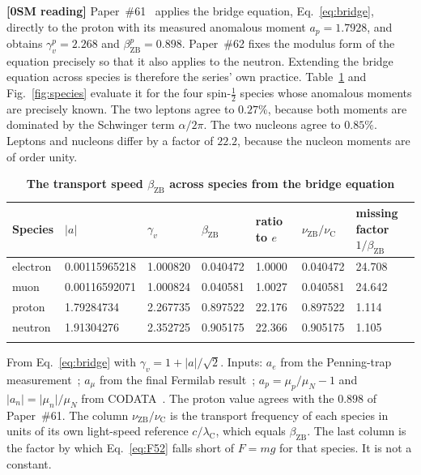\documentclass[%
 reprint, amsmath,amssymb, aps, prb, ]{revtex4-2}
\numberwithin{equation}{section}
\newcommand{\betaZB}{\beta_{\text{ZB}}}
\newcommand{\lambdaC}{\lambda_{\text{C}}}
\newcommand{\nuZB}{\nu_{\text{ZB}}}
\newcommand{\nuC}{\nu_{\text{C}}}
\newcommand{\gv}{\gamma_v}
\begin{document}
\textbf{[0SM reading]} Paper~\#61~\cite{hanamura61} applies the bridge equation, Eq.~\eqref{eq:bridge}, directly to the proton with its measured anomalous moment $a_p = 1.7928$, and obtains $\gv^{p} = 2.268$ and $\betaZB^{p} = 0.898$. Paper~\#62 fixes the modulus form of the equation precisely so that it also applies to the neutron. Extending the bridge equation across species is therefore the series' own practice. Table~\ref{tab:species} and Fig.~\ref{fig:species} evaluate it for the four spin-$\tfrac12$ species whose anomalous moments are precisely known. The two leptons agree to $0.27\%$, because both moments are dominated by the Schwinger term $\alpha/2\pi$. The two nucleons agree to $0.85\%$. Leptons and nucleons differ by a factor of $22.2$, because the nucleon moments are of order unity.

\begin{table}[t!]
\centering
\caption{\textbf{The transport speed $\betaZB$ across species from the bridge equation}}
\label{tab:species}
\renewcommand{\arraystretch}{1.4}
\begin{tabular}{p{2.0cm}p{2.6cm}p{1.9cm}p{1.9cm}p{2.0cm}p{2.4cm}p{2.5cm}}
\toprule
\textbf{Species} & \textbf{$\lvert a\rvert$} & \textbf{$\gv$} & \textbf{$\betaZB$} & \textbf{ratio to $e$} & \textbf{$\nuZB/\nuC$} & \textbf{missing factor $1/\betaZB$} \\
\midrule
electron & 0.00115965218 & 1.000820 & 0.040472 & 1.0000 & 0.040472 & \textcolor{fail}{24.708} \\
\addlinespace[0.3cm]
muon & 0.00116592071 & 1.000824 & 0.040581 & 1.0027 & 0.040581 & \textcolor{fail}{24.642} \\
\addlinespace[0.3cm]
proton & 1.79284734 & 2.267735 & 0.897522 & 22.176 & 0.897522 & \textcolor{fail}{1.114} \\
\addlinespace[0.3cm]
neutron & 1.91304276 & 2.352725 & 0.905175 & 22.366 & 0.905175 & \textcolor{fail}{1.105} \\
\addlinespace[0.2cm]
\bottomrule
\end{tabular}
\vspace{0.2cm}
\begin{minipage}{0.95\textwidth}
\justifying\footnotesize
From Eq.~\eqref{eq:bridge} with $\gv = 1 + \lvert a\rvert/\sqrt{2}$. Inputs: $a_e$ from the Penning-trap measurement~\cite{fan2023}; $a_\mu$ from the final Fermilab result~\cite{muong2_2025}; $a_p = \mu_p/\mu_N - 1$ and $\lvert a_n\rvert = \lvert\mu_n\rvert/\mu_N$ from CODATA~\cite{codata2022}. The proton value agrees with the $0.898$ of Paper~\#61. The column $\nuZB/\nuC$ is the transport frequency of each species in units of its own light-speed reference $c/\lambdaC$, which equals $\betaZB$. The last column is the factor by which Eq.~\eqref{eq:F52} falls short of $F = mg$ for that species. It is not a constant.
\end{minipage}
\end{table}
\end{document}
